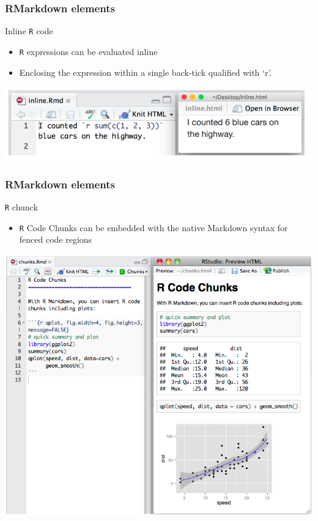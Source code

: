 \documentclass{beamer}
\begin{document}
\begin{frame}
    \frametitle{RMarkdown elements}
	\centering \Large Inline \texttt{R} code
	\normalsize
	\begin{itemize}
		\item \texttt{R} expressions can be evaluated inline 
		\item Enclosing the expression within a single back-tick qualified with ‘r’.
	\end{itemize}
	\begin{center}	\includegraphics[scale=0.4]{figures/RMarkdown_inline.png} \end{center}
\end{frame}

\begin{frame}
    \frametitle{RMarkdown elements}
	    \centering \Large \texttt{R} chunck
	\begin{itemize}
		\normalsize
		\item \texttt{R} Code Chunks can be embedded with the native Markdown syntax for fenced code regions
	\end{itemize}
    \begin{center}\includegraphics[scale=0.35]{figures/RmarkdownExample2.png}\end{center}
\end{frame}
\end{document}
